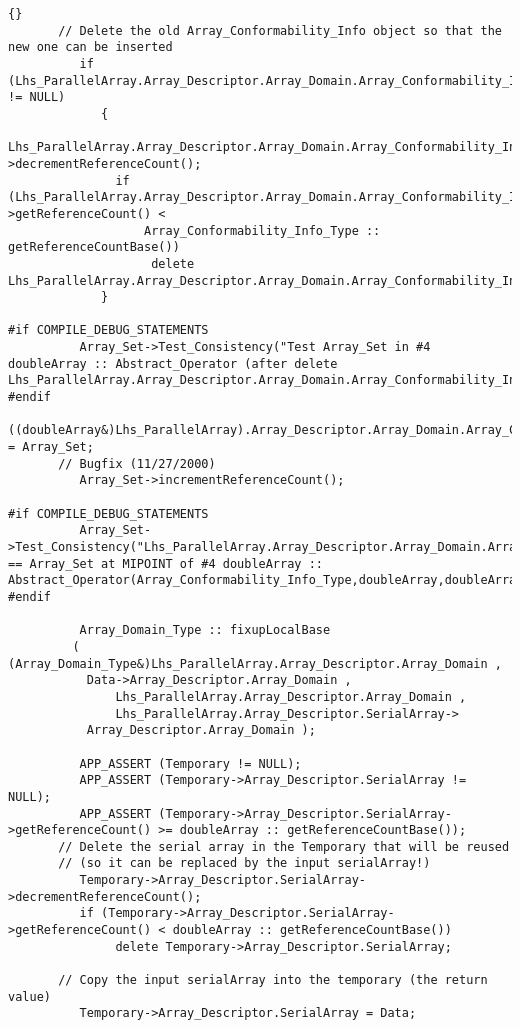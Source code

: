 \documentclass[10pt]{llncs}
\begin{document}
\begin{lstlisting}{}
       // Delete the old Array_Conformability_Info object so that the new one can be inserted
          if (Lhs_ParallelArray.Array_Descriptor.Array_Domain.Array_Conformability_Info != NULL)
             {
               Lhs_ParallelArray.Array_Descriptor.Array_Domain.Array_Conformability_Info->decrementReferenceCount();
               if (Lhs_ParallelArray.Array_Descriptor.Array_Domain.Array_Conformability_Info->getReferenceCount() < 
                   Array_Conformability_Info_Type :: getReferenceCountBase())
                    delete Lhs_ParallelArray.Array_Descriptor.Array_Domain.Array_Conformability_Info;
             }

#if COMPILE_DEBUG_STATEMENTS
          Array_Set->Test_Consistency("Test Array_Set in #4 doubleArray :: Abstract_Operator (after delete Lhs_ParallelArray.Array_Descriptor.Array_Domain.Array_Conformability_Info)");
#endif
          ((doubleArray&)Lhs_ParallelArray).Array_Descriptor.Array_Domain.Array_Conformability_Info = Array_Set;
       // Bugfix (11/27/2000)
          Array_Set->incrementReferenceCount();

#if COMPILE_DEBUG_STATEMENTS
          Array_Set->Test_Consistency("Lhs_ParallelArray.Array_Descriptor.Array_Domain.Array_Conformability_Info == Array_Set at MIPOINT of #4 doubleArray :: Abstract_Operator(Array_Conformability_Info_Type,doubleArray,doubleArray,doubleSerialArray)");
#endif

          Array_Domain_Type :: fixupLocalBase 
	     ( (Array_Domain_Type&)Lhs_ParallelArray.Array_Descriptor.Array_Domain , 
	       Data->Array_Descriptor.Array_Domain , 
               Lhs_ParallelArray.Array_Descriptor.Array_Domain , 
               Lhs_ParallelArray.Array_Descriptor.SerialArray->
	       Array_Descriptor.Array_Domain );

          APP_ASSERT (Temporary != NULL);
          APP_ASSERT (Temporary->Array_Descriptor.SerialArray != NULL);
          APP_ASSERT (Temporary->Array_Descriptor.SerialArray->getReferenceCount() >= doubleArray :: getReferenceCountBase());
       // Delete the serial array in the Temporary that will be reused 
       // (so it can be replaced by the input serialArray!)
          Temporary->Array_Descriptor.SerialArray->decrementReferenceCount();
          if (Temporary->Array_Descriptor.SerialArray->getReferenceCount() < doubleArray :: getReferenceCountBase())
               delete Temporary->Array_Descriptor.SerialArray;

       // Copy the input serialArray into the temporary (the return value)
          Temporary->Array_Descriptor.SerialArray = Data;



\end{lstlisting}
\end{document}
